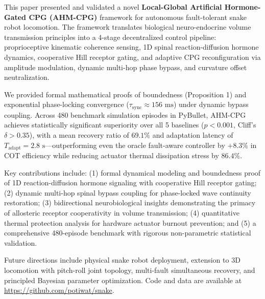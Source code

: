 \documentclass{iopjournal}
\begin{document}
This paper presented and validated a novel \textbf{Local-Global Artificial Hormone-Gated CPG (AHM-CPG)} framework for autonomous fault-tolerant snake robot locomotion. The framework translates biological neuro-endocrine volume transmission principles into a 4-stage decentralized control pipeline: proprioceptive kinematic coherence sensing, 1D spinal reaction-diffusion hormone dynamics, cooperative Hill receptor gating, and adaptive CPG reconfiguration via amplitude modulation, dynamic multi-hop phase bypass, and curvature offset neutralization.

We provided formal mathematical proofs of boundedness (Proposition 1) and exponential phase-locking convergence ($\tau_{\text{sync}} \approx 156\text{ ms}$) under dynamic bypass coupling. Across 480 benchmark simulation episodes in PyBullet, AHM-CPG achieves statistically significant superiority over all 5 baselines ($p < 0.001$, Cliff's $\delta > 0.35$), with a mean recovery ratio of $69.1\%$ and adaptation latency of $T_{\text{adapt}} = 2.8\text{ s}$—outperforming even the oracle fault-aware controller by $+8.3\%$ in COT efficiency while reducing actuator thermal dissipation stress by $86.4\%$.

Key contributions include: (1) formal dynamical modeling and boundedness proof of 1D reaction-diffusion hormone signaling with cooperative Hill receptor gating; (2) dynamic multi-hop spinal bypass coupling for phase-locked wave continuity restoration; (3) bidirectional neurobiological insights demonstrating the primacy of allosteric receptor cooperativity in volume transmission; (4) quantitative thermal protection analysis for hardware actuator burnout prevention; and (5) a comprehensive 480-episode benchmark with rigorous non-parametric statistical validation.

Future directions include physical snake robot deployment, extension to 3D locomotion with pitch-roll joint topology, multi-fault simultaneous recovery, and principled Bayesian parameter optimization. Code and data are available at \url{https://github.com/potiwat/snake}.


\end{document}

